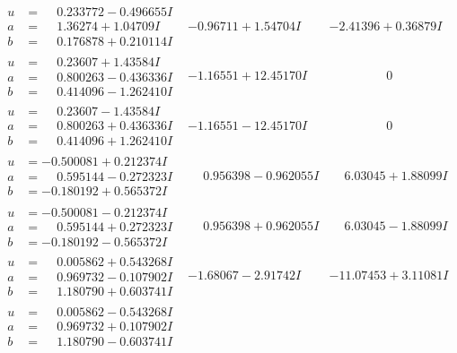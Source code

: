 \documentclass[1p]{elsarticle_modified}
\theoremstyle{definition}
\begin{document}
$$\begin{array}{c|c|c}
\begin{aligned}
u &= \phantom{-}0.233772 - 0.496655 I \\
a &= \phantom{-}1.36274 + 1.04709 I \\
b &= \phantom{-}0.176878 + 0.210114 I\end{aligned}
 & -0.96711 + 1.54704 I & -2.41396 + 0.36879 I \\ \hline\begin{aligned}
u &= \phantom{-}0.23607 + 1.43584 I \\
a &= \phantom{-}0.800263 - 0.436336 I \\
b &= \phantom{-}0.414096 - 1.262410 I\end{aligned}
 & -1.16551 + 12.45170 I & \phantom{-0.000000 } 0 \\ \hline\begin{aligned}
u &= \phantom{-}0.23607 - 1.43584 I \\
a &= \phantom{-}0.800263 + 0.436336 I \\
b &= \phantom{-}0.414096 + 1.262410 I\end{aligned}
 & -1.16551 - 12.45170 I & \phantom{-0.000000 } 0 \\ \hline\begin{aligned}
u &= -0.500081 + 0.212374 I \\
a &= \phantom{-}0.595144 - 0.272323 I \\
b &= -0.180192 + 0.565372 I\end{aligned}
 & \phantom{-}0.956398 - 0.962055 I & \phantom{-}6.03045 + 1.88099 I \\ \hline\begin{aligned}
u &= -0.500081 - 0.212374 I \\
a &= \phantom{-}0.595144 + 0.272323 I \\
b &= -0.180192 - 0.565372 I\end{aligned}
 & \phantom{-}0.956398 + 0.962055 I & \phantom{-}6.03045 - 1.88099 I \\ \hline\begin{aligned}
u &= \phantom{-}0.005862 + 0.543268 I \\
a &= \phantom{-}0.969732 - 0.107902 I \\
b &= \phantom{-}1.180790 + 0.603741 I\end{aligned}
 & -1.68067 - 2.91742 I & -11.07453 + 3.11081 I \\ \hline\begin{aligned}
u &= \phantom{-}0.005862 - 0.543268 I \\
a &= \phantom{-}0.969732 + 0.107902 I \\
b &= \phantom{-}1.180790 - 0.603741 I\end{aligned}

\end{array}$$
\end{document}
